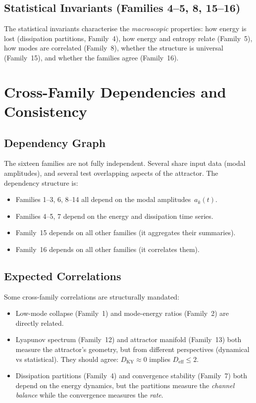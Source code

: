 \documentclass[11pt,twoside,openright]{book}
\theoremstyle{definition}
\theoremstyle{plain}
\theoremstyle{definition}
\theoremstyle{remark}
\begin{document}
\section{Statistical Invariants (Families 4--5, 8, 15--16)}

The statistical invariants characterise the \emph{macroscopic} properties: how energy is lost (dissipation partitions, Family~4), how energy and entropy relate (Family~5), how modes are correlated (Family~8), whether the structure is universal (Family~15), and whether the families agree (Family~16).


\chapter{Cross-Family Dependencies and Consistency}\label{ch:cross-family}

\section{Dependency Graph}

The sixteen families are not fully independent. Several share input data (modal amplitudes), and several test overlapping aspects of the attractor. The dependency structure is:
\begin{itemize}
\item Families 1--3, 6, 8--14 all depend on the modal amplitudes~\(a_k(t)\).
\item Families 4--5, 7 depend on the energy and dissipation time series.
\item Family~15 depends on all other families (it aggregates their summaries).
\item Family~16 depends on all other families (it correlates them).
\end{itemize}

\section{Expected Correlations}

Some cross-family correlations are structurally mandated:
\begin{itemize}
\item Low-mode collapse (Family~1) and mode-energy ratios (Family~2) are directly related.
\item Lyapunov spectrum (Family~12) and attractor manifold (Family~13) both measure the attractor's geometry, but from different perspectives (dynamical vs statistical). They should agree: \(D_{\mathrm{KY}} \approx 0\) implies \(D_{\mathrm{eff}} \leq 2\).
\item Dissipation partitions (Family~4) and convergence stability (Family~7) both depend on the energy dynamics, but the partitions measure the \emph{channel balance} while the convergence measures the \emph{rate}.
\end{itemize}
\end{document}
